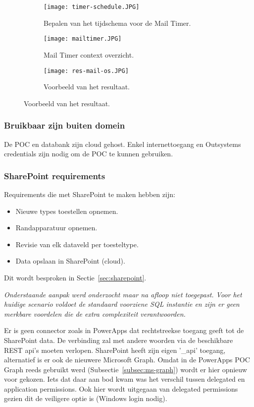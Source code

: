 \begin{figure}[h!]
    \centering
    \begin{subfigure}[b]{0.5\linewidth}
        \texttt{[image: timer-schedule.JPG]}
        \caption{Bepalen van het tijdschema voor de Mail Timer.}
    \end{subfigure}
    \begin{subfigure}[b]{0.45\linewidth}
        \texttt{[image: mailtimer.JPG]}
        \caption{Mail Timer context overzicht.}
    \end{subfigure}
    \begin{subfigure}[b]{0.6\linewidth}
        \texttt{[image: res-mail-os.JPG]}
        \caption{Voorbeeld van het resultaat.}
    \end{subfigure}
    \label{fig:mail-timer}
\end{figure}

\subsubsection{Bruikbaar zijn buiten domein}

De POC en databank zijn cloud gehost. Enkel internettoegang en Outsystems credentials zijn nodig om de POC te kunnen gebruiken.

\subsubsection{SharePoint requirements}

Requirements die met SharePoint te maken hebben zijn:
\begin{itemize}
    \item Nieuwe types toestellen opnemen.
    \item Randapparatuur opnemen.
    \item Revisie van elk dataveld per toesteltype.
    \item Data opslaan in SharePoint (cloud).
\end{itemize}
Dit wordt besproken in Sectie~\ref{sec:sharepoint}.

\textit{Onderstaande aanpak werd onderzocht maar na afloop niet toegepast. Voor het huidige scenario voldoet de standaard voorziene SQL instantie en zijn er geen merkbare voordelen die de extra complexiteit verantwoorden.}

Er is geen connector zoals in PowerApps dat rechtstreekse toegang geeft tot de SharePoint data. De verbinding zal met andere woorden via de beschikbare REST api's moeten verlopen. SharePoint heeft zijn eigen '\_api' toegang, alternatief is er ook de nieuwere Microsoft Graph. Omdat in de PowerApps POC Graph reeds gebruikt werd (Subsectie~\ref{subsec:ms-graph}) wordt er hier opnieuw voor gekozen. Iets dat daar aan bod kwam was het verschil tussen delegated en application permissions. Ook hier wordt uitgegaan van delegated permissions gezien dit de veiligere optie is (Windows login nodig).

